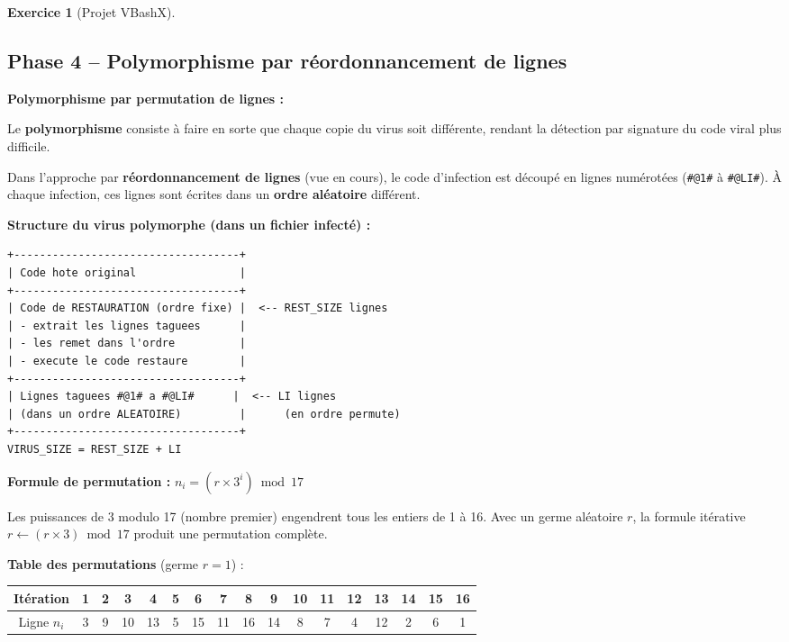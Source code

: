 \documentclass[a4paper,11pt]{article}
\theoremstyle{plain}
\theoremstyle{definition}
\newtheorem{exercice}{Exercice}
\begin{document}
\begin{exercice}[Projet VBashX]
\begin{correction}
\end{correction}



\subsection*{Phase 4 -- Polymorphisme par réordonnancement de lignes}

\begin{rappel}
\textbf{Polymorphisme par permutation de lignes :}

Le \textbf{polymorphisme} consiste à faire en sorte que chaque copie du virus soit différente, rendant la détection par signature du code viral plus difficile.

Dans l'approche par \textbf{réordonnancement de lignes} (vue en cours), le code d'infection est découpé en lignes numérotées (\texttt{\#@1\#} à \texttt{\#@LI\#}). À chaque infection, ces lignes sont écrites dans un \textbf{ordre aléatoire} différent.

\medskip
\textbf{Structure du virus polymorphe (dans un fichier infecté) :}
\begin{lstlisting}[numbers=none,frame=none,backgroundcolor=\color{white},language={}]
+-----------------------------------+
| Code hote original                |
+-----------------------------------+
| Code de RESTAURATION (ordre fixe) |  <-- REST_SIZE lignes
| - extrait les lignes taguees      |
| - les remet dans l'ordre          |
| - execute le code restaure        |
+-----------------------------------+
| Lignes taguees #@1# a #@LI#      |  <-- LI lignes
| (dans un ordre ALEATOIRE)         |      (en ordre permute)
+-----------------------------------+
VIRUS_SIZE = REST_SIZE + LI
\end{lstlisting}

\medskip
\textbf{Formule de permutation :} $n_i = (r \times 3^i) \bmod 17$

Les puissances de 3 modulo 17 (nombre premier) engendrent tous les entiers de 1 à 16. Avec un germe aléatoire $r$, la formule itérative $r \leftarrow (r \times 3) \bmod 17$ produit une permutation complète.

\medskip
\textbf{Table des permutations} (germe $r = 1$) :

\begin{center}
\begin{tabular}{c|cccccccccccccccc}
\toprule
Itération & 1 & 2 & 3 & 4 & 5 & 6 & 7 & 8 & 9 & 10 & 11 & 12 & 13 & 14 & 15 & 16 \\
\midrule
Ligne $n_i$ & 3 & 9 & 10 & 13 & 5 & 15 & 11 & 16 & 14 & 8 & 7 & 4 & 12 & 2 & 6 & 1 \\
\bottomrule
\end{tabular}
\end{center}


\end{rappel}
\end{exercice}
\end{document}
